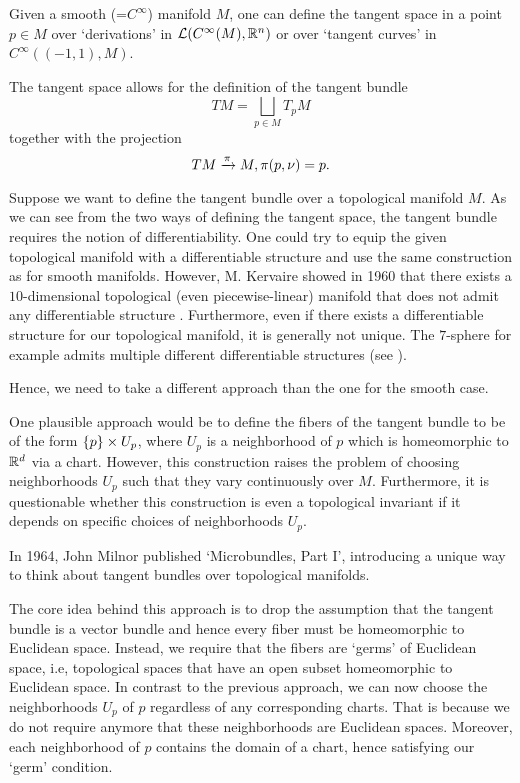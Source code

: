 \begin{myparagraph} Given a smooth (=$C^\infty$) manifold $M$, one can define the tangent space in a point $p \in M$ over `derivations' in $\mathcal{L}(C^\infty(M), \mathbb{R}^n)$ or over `tangent curves' in $C^\infty((-1, 1), M)$.

The tangent space allows for the definition of the tangent bundle \[ TM = \bigsqcup_{p \in M} T_p M\] together with the projection \[ TM \xrightarrow{\pi} M, \pi(p, \nu) = p. \]

Suppose we want to define the tangent bundle over a topological manifold $M$. As we can see from the two ways of defining the tangent space, the tangent bundle requires the notion of differentiability. One could try to equip the given topological manifold with a differentiable structure and use the same construction as for smooth manifolds. However, M. Kervaire showed in 1960 that there exists a $10$-dimensional topological (even piecewise-linear) manifold that does not admit any differentiable structure \cite{kervaire}. Furthermore, even if there exists a differentiable structure for our topological manifold, it is generally not unique. The $7$-sphere for example admits multiple different differentiable structures (see \cite{milnor7sphere}).

Hence, we need to take a different approach than the one for the smooth case.

One plausible approach would be to define the fibers of the tangent bundle to be of the form $\{p\} \times U_p$, where $U_p$ is a neighborhood of $p$ which is homeomorphic to $\mathbb{R}^d$ via a chart. However, this construction raises the problem of choosing neighborhoods $U_p$ such that they vary continuously over $M$. Furthermore, it is questionable whether this construction is even a topological invariant if it depends on specific choices of neighborhoods $U_p$.

In 1964, John Milnor published `Microbundles, Part I', introducing a unique way to think about tangent bundles over topological manifolds.

The core idea behind this approach is to drop the assumption that the tangent bundle is a vector bundle and hence every fiber must be homeomorphic to Euclidean space. Instead, we require that the fibers are `germs' of Euclidean space, i.e, topological spaces that have an open subset homeomorphic to Euclidean space. In contrast to the previous approach, we can now choose the neighborhoods $U_p$ of $p$ regardless of any corresponding charts. That is because we do not require anymore that these neighborhoods are Euclidean spaces. Moreover, each neighborhood of $p$ contains the domain of a chart, hence satisfying our `germ' condition.


\end{myparagraph}

